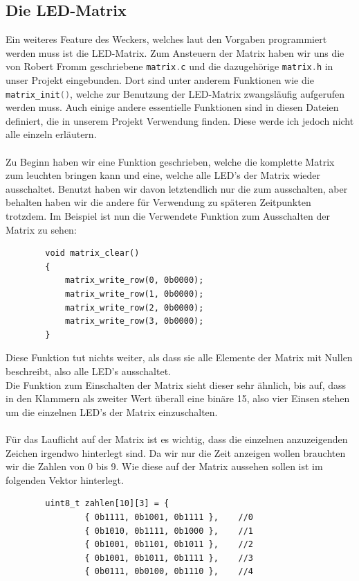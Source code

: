 \documentclass[openright,twoside,11pt,a4paper]{scrartcl}
\begin{document}
\begin{flushleft}
	 	
	 	\section{Die LED-Matrix}
	 	Ein weiteres Feature des Weckers, welches laut den Vorgaben programmiert werden muss ist die LED-Matrix. Zum Ansteuern der Matrix haben wir uns die von Robert Fromm geschriebene \lstinline[language=c++]|matrix.c| und die dazugehörige \lstinline[language=c++]|matrix.h| in unser Projekt eingebunden. Dort sind unter anderem Funktionen wie die \lstinline[language=c++]|matrix_init()|, welche zur Benutzung der LED-Matrix zwangsläufig aufgerufen werden muss. Auch einige andere essentielle Funktionen sind in diesen Dateien definiert, die in unserem Projekt Verwendung finden. Diese werde ich jedoch nicht alle einzeln erläutern.\\
	 	\ \\
	 	Zu Beginn haben wir eine Funktion geschrieben, welche die komplette Matrix zum leuchten bringen kann und eine, welche alle LED's der Matrix wieder ausschaltet. Benutzt haben wir davon letztendlich nur die zum ausschalten, aber behalten haben wir die andere für Verwendung zu späteren Zeitpunkten trotzdem. Im Beispiel ist nun die Verwendete Funktion zum Ausschalten der Matrix zu sehen:
	 	\begin{lstlisting}
	 	void matrix_clear()
	 	{
		 	matrix_write_row(0, 0b0000);
		 	matrix_write_row(1, 0b0000);
		 	matrix_write_row(2, 0b0000);
		 	matrix_write_row(3, 0b0000);
	 	}
	 	\end{lstlisting}
	 	Diese Funktion tut nichts weiter, als dass sie alle Elemente der Matrix mit Nullen beschreibt, also alle LED's ausschaltet.\\
	 	Die Funktion zum Einschalten der Matrix sieht dieser sehr ähnlich, bis auf, dass in den Klammern als zweiter Wert überall eine binäre 15, also vier Einsen stehen um die einzelnen LED's der Matrix einzuschalten. \\
	 	\ \\
	 	Für das Lauflicht auf der Matrix ist es wichtig, dass die einzelnen anzuzeigenden Zeichen irgendwo hinterlegt sind. Da wir nur die Zeit anzeigen wollen brauchten wir die Zahlen von 0 bis 9. Wie diese auf der Matrix aussehen sollen ist im folgenden Vektor hinterlegt.
	 	\begin{lstlisting}
	 	uint8_t zahlen[10][3] = {
	 			{ 0b1111, 0b1001, 0b1111 },    //0
			 	{ 0b1010, 0b1111, 0b1000 },    //1
			 	{ 0b1001, 0b1101, 0b1011 },    //2
			 	{ 0b1001, 0b1011, 0b1111 },    //3
			 	{ 0b0111, 0b0100, 0b1110 },    //4

\end{lstlisting}
\end{flushleft}
\end{document}
